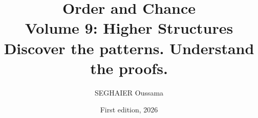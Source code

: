 \documentclass[11pt,openany]{book}
\title{\Huge\textbf{Order and Chance}\\[0.4em]\LARGE Volume 9: Higher Structures\\[0.6em]
\Large Discover the patterns. Understand the proofs.}
\author{SEGHAIER Oussama}
\date{First edition, 2026}
\begin{document}
\frontmatter
\makecover
\maketitle

\tableofcontents

\mainmatter












\end{document}
